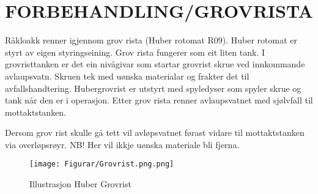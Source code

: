 \newpage
\section{FORBEHANDLING/GROVRISTA}
Råkloakk renner igjennom grov rista (Huber rotomat R09). Huber rotomat er styrt av eigen styringseining.
Grov rista fungerer som eit liten tank. I grovristtanken er det ein nivågivar som startar grovrist skrue ved innkommande avlaupsvatn. 
Skruen tek med uønska materialar og frakter det til avfallshandtering. Hubergrovrist er utstyrt med spyledyser som spyler skrue og tank når den er i operasjon.
Etter grov rista renner avlaupsvatnet med sjølvfall til mottaktstanken.

Dersom grov rist skulle gå tett vil avløpsvatnet førast vidare til mottaktstanken via overløpsrøyr. NB! Her vil ikkje uønska materiale bli fjerna.

\begin{figure}[htbp]
    \centering
    \texttt{[image: Figurar/Grovrist.png.png]}
    \caption{Illustrasjon Huber Grovrist}\label{fig:Huber Grovrist}
\end{figure}
    
